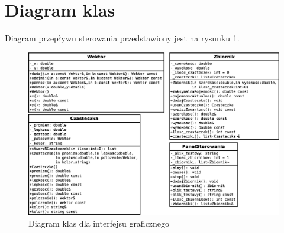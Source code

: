 
\section{Diagram klas}
Diagram przepływu sterowania przedstawiony jest na rysunku \ref{fig:diagram_klas_gui}.

\begin{figure}[H]
 \begin{center} 
  \includegraphics[width=\textwidth] {rysunki/diagram_klas} 
 \end{center}
 \caption{Diagram klas dla interfejsu graficznego}
 \label{fig:diagram_klas_gui} 
\end{figure}   